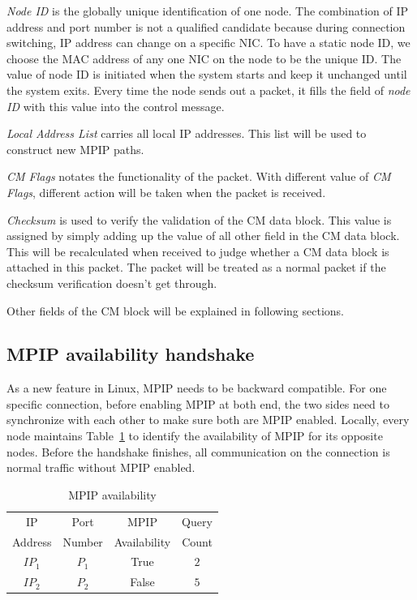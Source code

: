 \emph{Node ID} is the globally unique identification of one node. The combination of IP address and port number is not a qualified candidate because during connection switching, IP address can change on a specific NIC. To have a static node ID, we choose the MAC address of any one NIC on the node to be the unique ID.
The value of node ID is initiated when the system starts and keep it unchanged until the system exits. Every time the node sends out a packet, it fills the field of \emph{node ID} with this value into the control message.

\emph{Local Address List} carries all local IP addresses. This list will be used to construct new MPIP paths.

\emph{CM Flags} notates the functionality of the packet. With different value of \emph{CM Flags}, different action will be taken when the packet is received.

\emph{Checksum} is used to verify the validation of the CM data block. This value is assigned by simply adding up the value of all other field in the CM data block. This will be recalculated when received to judge whether a CM data block is attached in this packet. The packet will be treated as a normal packet if the checksum verification doesn't get through.

Other fields of the CM block will be explained in following sections.

\subsection{MPIP availability handshake}
\label{sec:handshake}

As a new feature in Linux, MPIP needs to be backward compatible. For one specific connection, before enabling MPIP at both end, the two sides need to synchronize with each other to make sure both are MPIP enabled. Locally, every node maintains Table~\ref{tb.me} to identify the availability of MPIP for its opposite nodes. Before the handshake finishes, all communication on the connection is normal traffic without MPIP enabled.

\begin{table}[htbp]
\caption{\label{tb.me}MPIP availability}
\centering
\begin{tabular}{|c|c|c|c|}
\hline
IP 		& Port 	 & MPIP 		   & Query\\
Address & Number & Availability & Count\\
\hline
${IP}_{1}$ & ${P}_{1}$ & True  & $2$ \\
\hline
${IP}_{2}$ & ${P}_{2}$ & False & $5$ \\
\hline
\end{tabular}
\end{table}


